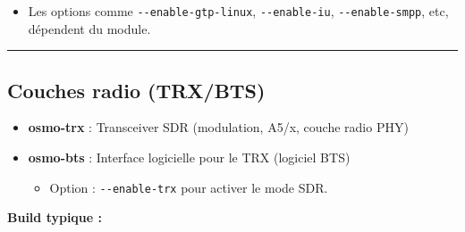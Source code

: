 \documentclass[
]{article}
\newenvironment{Shaded}{\begin{snugshade}}{\end{snugshade}}
\newcommand{\AttributeTok}[1]{\textcolor[rgb]{0.13,0.29,0.53}{#1}}
\newcommand{\BuiltInTok}[1]{#1}
\newcommand{\ExtensionTok}[1]{#1}
\newcommand{\FunctionTok}[1]{\textcolor[rgb]{0.13,0.29,0.53}{\textbf{#1}}}
\newcommand{\KeywordTok}[1]{\textcolor[rgb]{0.13,0.29,0.53}{\textbf{#1}}}
\newcommand{\NormalTok}[1]{#1}
\newcommand{\VariableTok}[1]{\textcolor[rgb]{0.00,0.00,0.00}{#1}}
\providecommand{\tightlist}{%
  \setlength{\itemsep}{0pt}\setlength{\parskip}{0pt}}
\begin{document}
\begin{itemize}
\tightlist
\item
  Les options comme \texttt{-\/-enable-gtp-linux},
  \texttt{-\/-enable-iu}, \texttt{-\/-enable-smpp}, etc, dépendent du
  module.
\end{itemize}

\begin{center}\rule{0.5\linewidth}{0.5pt}\end{center}

\subsection{Couches radio (TRX/BTS)}\label{couches-radio-trxbts}

\begin{itemize}
\item
  \textbf{osmo-trx} : Transceiver SDR (modulation, A5/x, couche radio
  PHY)
\item
  \textbf{osmo-bts} : Interface logicielle pour le TRX (logiciel BTS)

  \begin{itemize}
  \tightlist
  \item
    Option : \texttt{-\/-enable-trx} pour activer le mode SDR.
  \end{itemize}
\end{itemize}

\textbf{Build typique :}

\begin{Shaded}
\end{Shaded}
\end{document}
